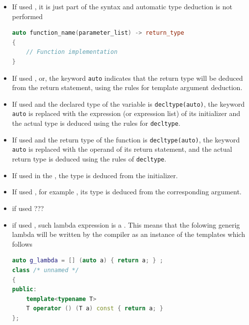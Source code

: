 \begin{itemize}
    \item If used , it is just part of the syntax and automatic type deduction 
    is not performed
    \begin{lstlisting}[language=C++]
auto function_name(parameter_list) -> return_type
{
    // Function implementation
}  
    \end{lstlisting}

    \item If used , or\newline {},    the keyword \texttt{auto} indicates 
    that the return type will be deduced from the return statement, 
    using the rules for template argument deduction.

    \item If used  and the declared 
    type of the variable is \texttt{decltype(auto)}, the keyword 
    \texttt{auto} is replaced with the expression (or expression list) 
    of its initializer and the actual type is deduced using the 
    rules for \texttt{decltype}.

    \item If used  and the return type of the function is 
    \texttt{decltype(auto)}, the keyword \texttt{auto} is replaced with 
    the operand of its return statement, and the actual return type is 
    deduced using the rules of \texttt{decltype}.

    \item If used in the , 
    the type is deduced from the initializer.
    
    \item If used , for example , 
    its type is deduced from the corresponding argument.
    
    \item if used  ???
    
    \item if used , 
    such lambda expression is a . This means 
    that the folowing generig lambda will be written by the compiler as 
    an instance of the templates which follows 
    \begin{lstlisting}[language=C++]
auto g_lambda = [] (auto a) { return a; } ;
class /* unnamed */
{
public:
    template<typename T>
    T operator () (T a) const { return a; }
};
    \end{lstlisting}


\end{itemize}
